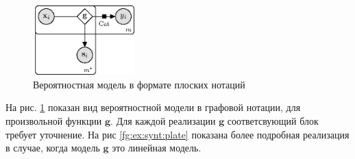 \begin{figure}[h!t]\center
\includegraphics[width=0.35\textwidth]{results/privlearn/general_model}
\caption{Вероятностная модель в формате плоских нотаций}
\label{fg:st:plate}
\end{figure}

На рис. \ref{fg:st:plate} показан вид вероятностной модели в графовой нотации, для произвольной функции $\mathbf{g}$. Для каждой реализации $\mathbf{g}$ соответсвующий блок требует уточнение. На рис \ref{fg:ex:synt:plate} показана более подробная реализация в случае, когда модель $\mathbf{g}$ это линейная модель.

